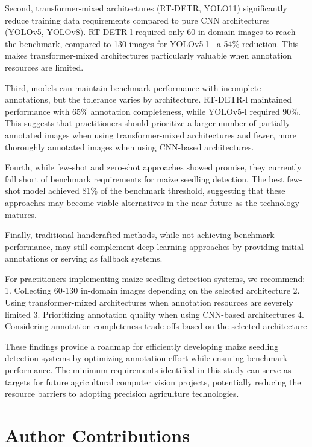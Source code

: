 \documentclass{article}
\begin{document}
Second, transformer-mixed architectures (RT-DETR, YOLO11) significantly reduce training data requirements compared to pure CNN architectures (YOLOv5, YOLOv8). RT-DETR-l required only 60 in-domain images to reach the benchmark, compared to 130 images for YOLOv5-l—a 54\% reduction. This makes transformer-mixed architectures particularly valuable when annotation resources are limited.

Third, models can maintain benchmark performance with incomplete annotations, but the tolerance varies by architecture. RT-DETR-l maintained performance with 65\% annotation completeness, while YOLOv5-l required 90\%. This suggests that practitioners should prioritize a larger number of partially annotated images when using transformer-mixed architectures and fewer, more thoroughly annotated images when using CNN-based architectures.

Fourth, while few-shot and zero-shot approaches showed promise, they currently fall short of benchmark requirements for maize seedling detection. The best few-shot model achieved 81\% of the benchmark threshold, suggesting that these approaches may become viable alternatives in the near future as the technology matures.

Finally, traditional handcrafted methods, while not achieving benchmark performance, may still complement deep learning approaches by providing initial annotations or serving as fallback systems.

For practitioners implementing maize seedling detection systems, we recommend:
1. Collecting 60-130 in-domain images depending on the selected architecture
2. Using transformer-mixed architectures when annotation resources are severely limited
3. Prioritizing annotation quality when using CNN-based architectures
4. Considering annotation completeness trade-offs based on the selected architecture

These findings provide a roadmap for efficiently developing maize seedling detection systems by optimizing annotation effort while ensuring benchmark performance. The minimum requirements identified in this study can serve as targets for future agricultural computer vision projects, potentially reducing the resource barriers to adopting precision agriculture technologies.

\section{Author Contributions}
\end{document}
